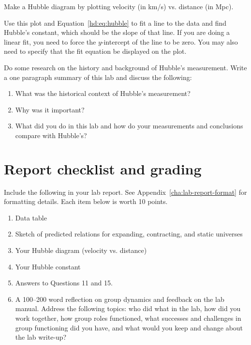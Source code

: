 \begin{steps}
	
	\item Make a Hubble diagram by plotting velocity (in km/s) vs. distance (in Mpc).
	
	\item Use this plot and Equation~\ref{hd:eq:hubble} to fit a line to the data and find Hubble's constant, which should be the slope of that line. If you are doing a linear fit, you need to force the $y$-intercept of the line to be zero. You may also need to specify that the fit equation be displayed on the plot.
	
	\item Do some research on the history and background of Hubble’s
	measurement. Write a one paragraph summary of this lab and discuss
	the following:
	\begin{enumerate}
		\item What was the historical context of Hubble’s measurement?
		\item Why was it important?
		\item What did you do in this lab and how do your measurements and
		conclusions compare with Hubble’s?
	\end{enumerate}
\end{steps}

\section{Report checklist and grading}

Include the following in your lab report. See Appendix~\ref{cha:lab-report-format} for formatting details. Each item below is worth 10 points.

\begin{enumerate}
	\item Data table
	
	\item Sketch of predicted relations for expanding, contracting, and static universes
	
	\item Your Hubble diagram (velocity vs. distance)
	
	\item Your Hubble constant
	
	\item Answers to Questions 11 and 15.
	
	\item A 100--200 word reflection on group dynamics and feedback on the lab manual. Address the following topics: who did what in the lab, how did you work together, how group roles functioned, what successes and challenges in group functioning did you have, and what would you keep and change about the lab write-up?
\end{enumerate}